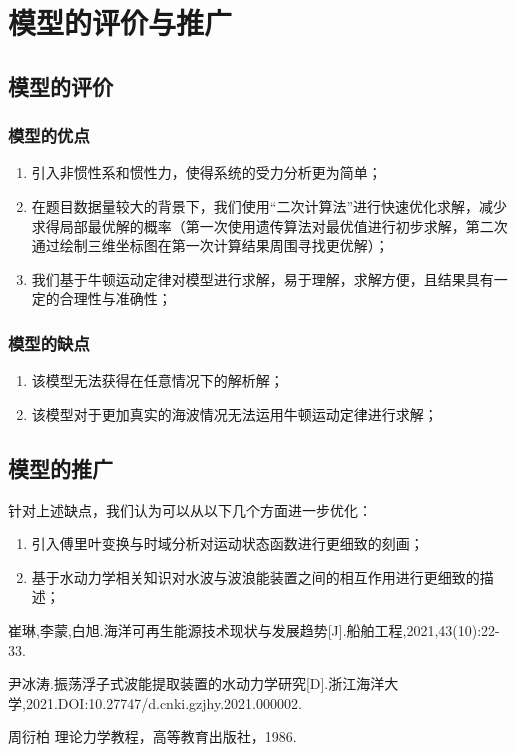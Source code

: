 \documentclass[12pt,utf8]{article}
\begin{document}
\section{模型的评价与推广}


\subsection{模型的评价}

\subsubsection{模型的优点}
\begin{enumerate}
\item 引入非惯性系和惯性力，使得系统的受力分析更为简单；
\item 在题目数据量较大的背景下，我们使用“二次计算法”进行快速优化求解，减少求得局部最优解的概率（第一次使用遗传算法对最优值进行初步求解，第二次通过绘制三维坐标图在第一次计算结果周围寻找更优解）；
\item 我们基于牛顿运动定律对模型进行求解，易于理解，求解方便，且结果具有一定的合理性与准确性；
\end{enumerate}

\subsubsection{模型的缺点}

\begin{enumerate}
\item 该模型无法获得在任意情况下的解析解；
\item 该模型对于更加真实的海波情况无法运用牛顿运动定律进行求解；
\end{enumerate}

\subsection{模型的推广}
针对上述缺点，我们认为可以从以下几个方面进一步优化：
\begin{enumerate}
	\item 引入傅里叶变换与时域分析对运动状态函数进行更细致的刻画；
	\item 基于水动力学相关知识对水波与波浪能装置之间的相互作用进行更细致的描述；
\end{enumerate}
 
 
 
\newpage
\begin{thebibliography}{99}  
	崔琳,李蒙,白旭.海洋可再生能源技术现状与发展趋势[J].船舶工程,2021,43(10):22-33.
	
	尹冰涛.振荡浮子式波能提取装置的水动力学研究[D].浙江海洋大学,2021.DOI:10.27747/d.cnki.gzjhy.2021.000002.
	
	周衍柏 理论力学教程，高等教育出版社，1986. 
\end{thebibliography}
\end{document}
